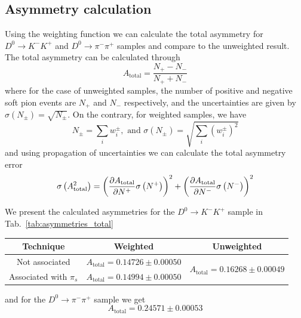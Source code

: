 \documentclass{article}
\begin{document}
        \pagebreak

        \subsection{Asymmetry calculation}
        Using the weighting function we can calculate the total asymmetry for $D^0\to K^-K^+$ and $D^0\to\pi^-\pi^+$ samples and compare to the unweighted result.
        The total asymmetry can be calculated through
        \begin{equation}
                A_\text{total} = \frac{N_+ - N_-}{N_+ + N_-}
        \end{equation}
        where for the case of unweighted samples, the number of positive and negative soft pion events are $N_+$ and $N_-$ respectively, and the uncertainties are given by $\sigma\left(N_\pm\right) = \sqrt{N_{\pm}}$.
        On the contrary, for weighted samples, we have
        \begin{equation}
                N_\pm = \sum_i w_i^\pm, \text{ and } \sigma\left(N_\pm\right) = \sqrt{\sum_i (w_i^\pm)^2}
        \end{equation} 
        and using propagation of uncertainties we can calculate the total asymmetry error
        \begin{equation}
                \sigma\left(A_{\text{total}} ^2\right) = \left(\pdv{A_{\text{total}}}{N^+}\sigma\left(N^+\right)\right)^2 + \left(\pdv{A_{\text{total}}}{N^-}\sigma\left(N^-\right)\right)^2
        \end{equation}

        We present the calculated asymmetries for the $D^0\to K^-K^+$ sample in Tab.~\ref{tab:asymmetries_total}
        \begin{center}
                \begin{tabular}{c|c|c}
                        Technique & Weighted & Unweighted\\
                        \hline\hline
                        Not associated & $A_\text{total} = 0.14726 \pm 0.00050$ & \multirow{2}{*}{$A_\text{total} = 0.16268 \pm 0.00049$}\\
                        \cline{1-2}
                        Associated with $\pi_s$ & $A_\text{total} = 0.14994 \pm 0.00050$ & \\
                \end{tabular}
                \label{tab:asymmetries_total}
        \end{center}
        and for the $D^0\to \pi^-\pi^+$ sample we get
        \begin{equation}
                A_\text{total} = 0.24571 \pm 0.00053
        \end{equation} 
\end{document}
